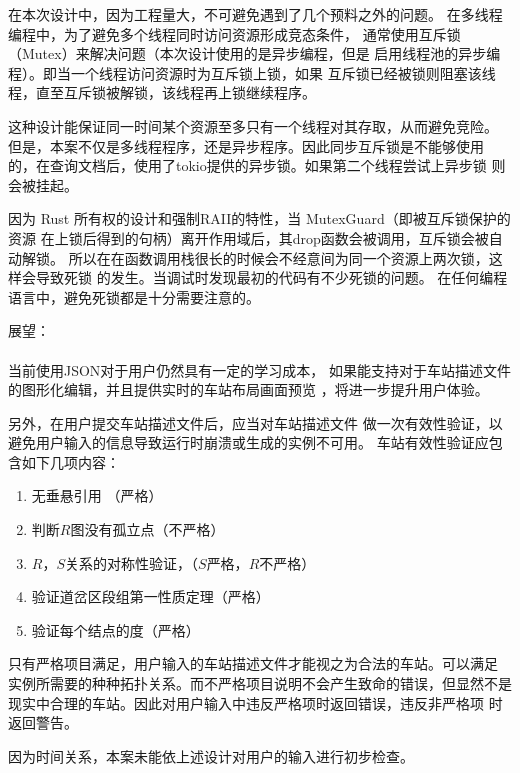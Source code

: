 \begin{keturon}
    在本次设计中，因为工程量大，不可避免遇到了几个预料之外的问题。
    在多线程编程中，为了避免多个线程同时访问资源形成竞态条件，
    通常使用互斥锁（Mutex）来解决问题（本次设计使用的是异步编程，但是
    启用线程池的异步编程）。即当一个线程访问资源时为互斥锁上锁，如果
    互斥锁已经被锁则阻塞该线程，直至互斥锁被解锁，该线程再上锁继续程序。

    这种设计能保证同一时间某个资源至多只有一个线程对其存取，从而避免竞险。
    但是，本案不仅是多线程程序，还是异步程序。因此同步互斥锁是不能够使用
    的，在查询文档后，使用了tokio提供的异步锁。如果第二个线程尝试上异步锁
    则会被挂起。

    因为 Rust 所有权的设计和强制RAII的特性，当 MutexGuard（即被互斥锁保护的资源
    在上锁后得到的句柄）离开作用域后，其drop函数会被调用，互斥锁会被自动解锁。
    所以在在函数调用栈很长的时候会不经意间为同一个资源上两次锁，这样会导致死锁
    的发生。当调试时发现最初的代码有不少死锁的问题。
    在任何编程语言中，避免死锁都是十分需要注意的。

    展望：

    \paragraph{} 当前使用JSON对于用户仍然具有一定的学习成本，
    如果能支持对于车站描述文件的图形化编辑，并且提供实时的车站布局画面预览
    ，将进一步提升用户体验。

    另外，在用户提交车站描述文件后，应当对车站描述文件
    做一次有效性验证，以避免用户输入的信息导致运行时崩溃或生成的实例不可用。
    车站有效性验证应包含如下几项内容：
    \begin{enumerate}
        \item 无垂悬引用 （严格）
        \item 判断$R$图没有孤立点（不严格）
        \item $R$，$S$关系的对称性验证，（$S$严格，$R$不严格）
        \item 验证道岔区段组第一性质定理（严格）
        \item 验证每个结点的度（严格）
    \end{enumerate}
    只有严格项目满足，用户输入的车站描述文件才能视之为合法的车站。可以满足
    实例所需要的种种拓扑关系。而不严格项目说明不会产生致命的错误，但显然不是
    现实中合理的车站。因此对用户输入中违反严格项时返回错误，违反非严格项
    时返回警告。

    因为时间关系，本案未能依上述设计对用户的输入进行初步检查。



\end{keturon}
